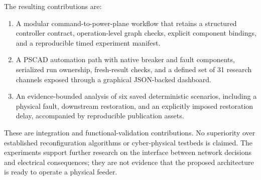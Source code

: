 The resulting contributions are:
\begin{enumerate}
\item A modular command-to-power-plane workflow that retains a structured
controller contract, operation-level graph checks, explicit component bindings,
and a reproducible timed experiment manifest.
\item A PSCAD automation path with native breaker and fault components,
serialized run ownership, fresh-result checks, and a defined set of 31 research
channels exposed through a graphical JSON-backed dashboard.
\item An evidence-bounded analysis of six saved deterministic scenarios,
including a physical fault, downstream restoration, and an explicitly imposed
restoration delay, accompanied by reproducible publication assets.
\end{enumerate}
These are integration and functional-validation contributions. No superiority
over established reconfiguration algorithms or cyber-physical testbeds is
claimed. The experiments support further research on the interface between
network decisions and electrical consequences; they are not evidence that
the proposed architecture is ready to operate a physical feeder.
